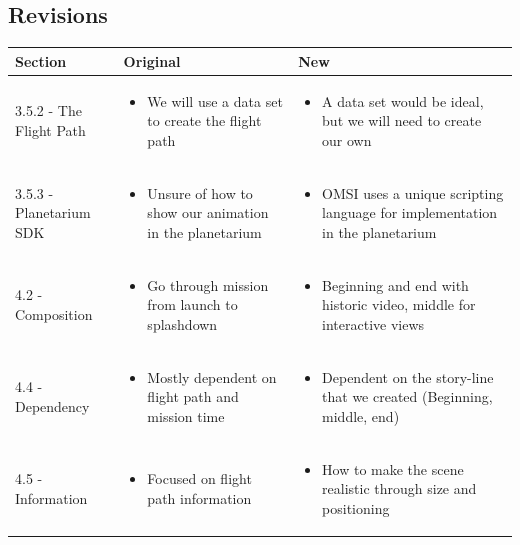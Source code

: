 \documentclass[onecolumn, draftclsnofoot,10pt, compsoc]{IEEEtran}
\begin{document}
\newpage
{}
\tableofcontents
\subsection*{Revisions}
\begin{tabular} {|p{4cm}|p{5cm}|p{6cm}|}
\hline
Section & Original & New \\ \hline
3.5.2 - The Flight Path & \begin{itemize}
  \item We will use a data set to create the flight path
\end{itemize} & \begin{itemize}
  \item A data set would be ideal, but we will need to create our own
\end{itemize}\\ \hline
3.5.3 - Planetarium SDK & \begin{itemize}
  \item Unsure of how to show our animation in the planetarium
\end{itemize} & \begin{itemize}
  \item OMSI uses a unique scripting language for implementation in the planetarium
\end{itemize}\\ \hline
4.2 - Composition & \begin{itemize}
  \item Go through mission from launch to splashdown
\end{itemize} & \begin{itemize}
  \item Beginning and end with historic video, middle for interactive views
\end{itemize}\\ \hline
4.4 - Dependency & \begin{itemize}
  \item Mostly dependent on flight path and mission time
\end{itemize} & \begin{itemize}
  \item Dependent on the story-line that we created (Beginning, middle, end)
\end{itemize}\\ \hline
4.5 - Information & \begin{itemize}
  \item Focused on flight path information
\end{itemize} & \begin{itemize}
  \item How to make the scene realistic through size and positioning
\end{itemize}\\ \hline

\end{tabular}
\end{document}
